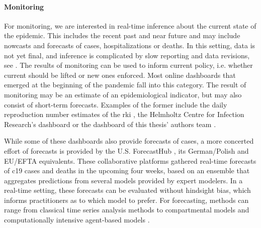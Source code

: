 \paragraph{Monitoring}
For monitoring, we are interested in real-time inference about the current state of the epidemic. This includes the recent past and near future and may include nowcasts and forecasts of cases, hospitalizations or deaths. In this setting, data is not yet final, and inference is complicated by slow reporting and data revisions, see . The results of monitoring can be used to inform current policy, i.e. whether current  should be lifted or new ones enforced. Most online dashboards that emerged at the beginning of the pandemic fall into this category. The result of monitoring may be an estimate of an epidemiological indicator, but may also consist of short-term forecasts. Examples of the former include the daily reproduction number estimates of the \acrshort{rki} \citep{AnDerHeiden2020Schatzung}, the Helmholtz Centre for Infection Research's dashboard \citep{Khailaie2021Development} or the dashboard of this thesis' authors team \citep{Hotz2020Monitoring}.

While some of these dashboards also provide forecasts of cases, a more concerted effort of forecasts is provided by the U.S. ForecastHub \citep{Ray2020Ensemble}, its German/Polish \citep{Bracher2021Preregistered,Bracher2022National} and EU/EFTA \citep{Sherratt2022Predictive} equivalents. These collaborative platforms gathered real-time forecasts of \acrshort{c19} cases and deaths in the upcoming four weeks, based on an ensemble that aggregates predictions from several models provided by expert modelers. In a real-time setting, these forecasts can be evaluated without hindsight bias, which informs practitioners as to which model to prefer. 
For forecasting, methods can range from classical time series analysis methods \citep{Arroyo-Marioli2021Tracking} to compartmental models \citep{Khailaie2021Development} and computationally intensive agent-based models \citep{Adamik2020Mitigation}.

